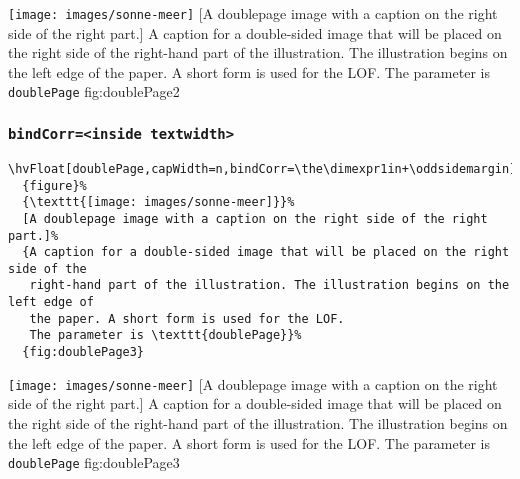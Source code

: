 \documentclass[twoside,twocolumn]{scrartcl}
\makeatletter
\let\hvBlindtext\Blindtext
\def\Blindtext{\par\color{black!40}\hvBlindtext\par\normalcolor}
\def\hvblindtext{\textcolor{black!40}{\blindtext@text}}
\makeatother
\begin{document}
%
  {\texttt{[image: images/sonne-meer]}}%
  [A doublepage image with a caption on the right side of the right part.]%
  {A caption for a double-sided image that will be placed on the right side of the
   right-hand part of the illustration. The illustration begins on the left edge of 
   the paper. A short form is used for the LOF. 
   The parameter is \texttt{doublePage}}%
  {fig:doublePage2}


\Blindtext

\Blindtext

\Blindtext

\hvblindtext

\subsubsection{\texttt{bindCorr=<inside textwidth>}}

\begin{lstlisting}
\hvFloat[doublePage,capWidth=n,bindCorr=\the\dimexpr1in+\oddsidemargin]%
  {figure}%
  {\texttt{[image: images/sonne-meer]}}%
  [A doublepage image with a caption on the right side of the right part.]%
  {A caption for a double-sided image that will be placed on the right side of the
   right-hand part of the illustration. The illustration begins on the left edge of 
   the paper. A short form is used for the LOF. 
   The parameter is \texttt{doublePage}}%
  {fig:doublePage3}
\end{lstlisting}

%
  {\texttt{[image: images/sonne-meer]}}%
  [A doublepage image with a caption on the right side of the right part.]%
  {A caption for a double-sided image that will be placed on the right side of the
   right-hand part of the illustration. The illustration begins on the left edge of 
   the paper. A short form is used for the LOF. 
   The parameter is \texttt{doublePage}}%
  {fig:doublePage3}


\Blindtext

\Blindtext
\end{document}

